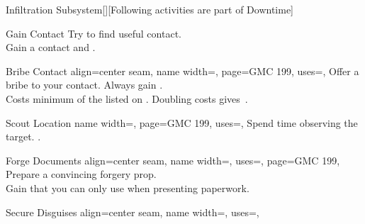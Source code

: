 \begin{PageFront}
\begin{Tables}{\frontTableHeight}
\begin{Table}{Infiltration Subsystem}[\;\dash\;][Following activities are part of
        Downtime]
\begin{entry}{Gain Contact}
{            }
                Try to find useful contact.\\
                Gain a contact and  .\hfill {}
            \end{entry}
            \begin{entry}{Bribe Contact}{%
                align=center seam,
                name width=\activityLength,%
                page=GMC 199,
                uses=,
            }
                Offer a bribe to your contact. \hfill Always gain  .\\
                Costs minimum  of the  listed on . \hfill
                Doubling costs gives \,\Cirm.\\
            \end{entry}
            \begin{entry}{Scout Location}{%
                name width=\activityLength,%
                page=GMC 199,
                uses=,
            }
                Spend time observing the target.\hfill {} \hfill{}.
            \end{entry}
            \begin{entry}{Forge Documents}{%
                align=center seam,
                name width=\activityLength,%
                uses={\Society[tags=S]},
                page=GMC 199,
            }
                Prepare a convincing forgery prop. \\
                Gain   that you can only use when presenting paperwork.\hfill {} 
            \end{entry}
            \begin{entry}{Secure Disguises}{%
                align=center seam,
                name width=\activityLength,%
                uses=,
}
\end{entry}
\end{Table}
\end{Tables}
\end{PageFront}

